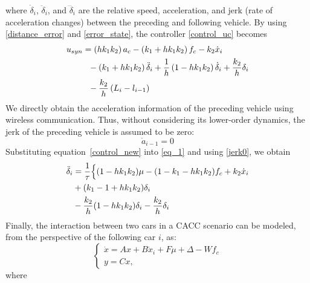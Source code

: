 \documentclass[conference]{IEEEtran}
\begin{document}
where $\dot{\delta}_{i}$, $\ddot{\delta}_{i}$, and $\dddot{\delta}_{i}$ are the relative speed, acceleration, and jerk (rate of acceleration changes) between the preceding and following vehicle. By using \eqref{distance_error} and \eqref{error_state}, the controller \eqref{control_uc} becomes 
\begin{align}\label{control_new}
        u_{s y n}&=\left(h k_1 k_2\right) a_c-\left(k_1+h k_1 k_2\right) f_c-k_2 \dot{x}_i \notag\\
       &~~ -\left(k_1+h k_1 k_2\right) \ddot{\delta}_i+\frac{1}{h}\left(1-h k_1 k_2\right) \dot{\delta}_i+\frac{k_2}{h} \delta_i \notag\\
       & ~~-\frac{k_2}{h}\left(L_i-l_{i-1}\right)
\end{align}
We directly obtain the acceleration information of the preceding 
vehicle using wireless communication. Thus, without considering its lower-order dynamics, the jerk of the preceding vehicle is assumed to be zero:
\begin{equation}\label{jerk0}
    \dot{a}_{i-1} = 0    
\end{equation}
Substituting equation~\eqref{control_new} into \eqref{eq_1} and using \eqref{jerk0}, we obtain 
\begin{align}
    \ddot{\delta}_{i}&=\frac{1}{\tau}\Big\{(1-h k_{1}k_{2})\mu-(1-k_{1}-h k_{1}k_{2})f_{c}+k_{2}\dot{x}_{i}\notag\\
    &+(k_{1}-1+h k_{1}k_{2})\delta_{i}\notag\\ 
    &-\frac{k_{2}}{h}(1-h k_{1}k_{2})\delta_{i}-\frac{k_{2}}{h}\delta_{i}
    \end{align}
Finally, the interaction between two cars in a CACC scenario can be modeled, from the perspective of the following car $i$, as:
\begin{equation}\label{CACC}
      \left\{ \begin{array}{l}
        \dot{x}=A x+B \dot{x}_i+F \mu+\Delta-W f_c \\
         y = Cx,\end{array}\right.
\end{equation}  
where 
\end{document}
